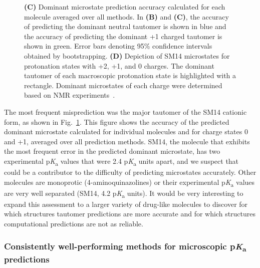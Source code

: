 \documentclass[9pt,lineno,final]{elife}
\newcommand{\pKa}{p\textit{K}\textsubscript{a}}
\begin{document}
\begin{figure}[h!]
{{\bf(C)} Dominant microstate prediction accuracy calculated for each molecule averaged over all methods. 
In {\bf(B)} and {\bf(C)}, the accuracy of predicting the dominant neutral tautomer is shown in blue and the accuracy of predicting the dominant +1 charged tautomer is shown in green. Error bars denoting 95\% confidence intervals obtained by bootstrapping.
{\bf(D)} Depiction of SM14 microstates for protonation states with +2, +1, and 0 charges. The dominant tautomer of each macroscopic protonation state is highlighted with a rectangle. Dominant microstates of each charge were determined based on NMR experiments~\citep{Isik:2018:J.Comput.AidedMol.Des.}.
}
\label{fig:typeI_dominant_microstate_accuracy}
\end{figure}

The most frequent misprediction was the major tautomer of the SM14 cationic form, as shown in Fig.~\ref{fig:typeI_dominant_microstate_accuracy}. 
This figure shows the accuracy of the predicted dominant microstate calculated for individual molecules and for charge states 0 and +1, averaged over all prediction methods. 
SM14, the molecule that exhibits the most frequent error in the predicted dominant microstate, has two experimental \pKa{} values that were 2.4 \pKa{} units apart, and we suspect that could be a contributor to the difficulty of predicting microstates accurately. 
Other molecules are monoprotic (4-aminoquinazolines) or their experimental \pKa{} values are very well separated (SM14, 4.2 \pKa{} units). 
It would be very interesting to expand this assessment to a larger variety of drug-like molecules to discover for which structures tautomer predictions are more accurate and for which structures computational predictions are not as reliable.


\subsubsection{Consistently well-performing methods for microscopic \pKa{} predictions}
\end{document}
